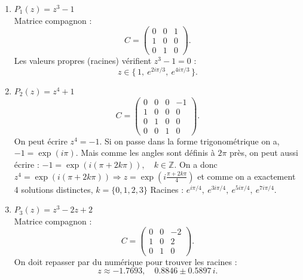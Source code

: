 \begin{solution}
\text{ }

\begin{enumerate}[label=(\alph*)]
    \item $P_1(z) = z^3 - 1$ \\
    Matrice compagnon :
    \[
    C =
    \begin{pmatrix}
    0 & 0 & 1 \\
    1 & 0 & 0 \\
    0 & 1 & 0
    \end{pmatrix}.
    \]
    Les valeurs propres (racines) vérifient $z^3-1=0$ : 
    \[
    z \in \{\,1,\ e^{2i\pi/3},\ e^{4i\pi/3}\,\}.
    \]

    \item $P_2(z) = z^4 + 1$
    \[
    C =
    \begin{pmatrix}
    0 & 0 & 0 & -1 \\
    1 & 0 & 0 & 0 \\
    0 & 1 & 0 & 0 \\
    0 & 0 & 1 & 0
    \end{pmatrix}.
    \]
    On peut écrire $z^4 = -1$. Si on passe dans la forme trigonométrique on a, $-1 = \exp(i \pi)$. Mais comme les angles sont définis à $2 \pi$ près, on peut aussi écrire : $-1 = \exp(i(\pi + 2 k \pi)), \quad k \in \mathbb{Z}$. On a donc $z^4 = \exp(i(\pi + 2 k \pi)) \Rightarrow z = \exp(i\frac{\pi + 2k \pi}{4})$ et comme on a exactement 4 solutions distinctes, $k=\{0,1,2,3\}$
    Racines : $e^{i\pi/4},\ e^{3i\pi/4},\ e^{5i\pi/4},\ e^{7i\pi/4}$.

    \item $P_3(z) = z^3 - 2z + 2$ \\
    Matrice compagnon :
    \[
    C =
    \begin{pmatrix}
    0 & 0 & -2 \\
    1 & 0 & 2 \\
    0 & 1 & 0
    \end{pmatrix}.
    \]
    On doit repasser par du numérique pour trouver les racines :
    \[
    z \approx -1.7693,\quad 0.8846 \pm 0.5897\,i.
    \]


\end{enumerate}
\end{solution}
